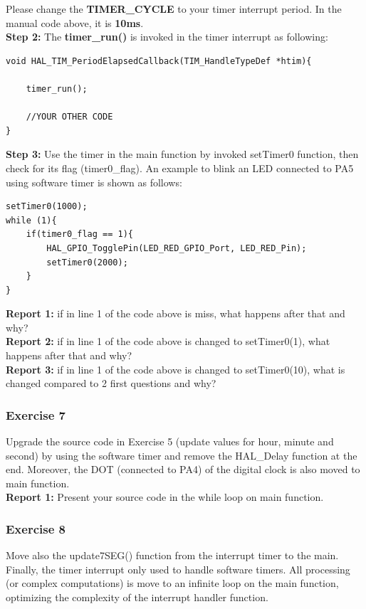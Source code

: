Please change the \textbf{TIMER\_CYCLE} to your timer interrupt period. In the manual code above, it is \textbf{10ms}. \\

\textbf{Step 2: } The \textbf{timer\_run()} is invoked in the timer interrupt as following:

\begin{lstlisting}[caption=Software timer based timer interrupt]
void HAL_TIM_PeriodElapsedCallback(TIM_HandleTypeDef *htim){
	
	timer_run();
	
	//YOUR OTHER CODE
}
\end{lstlisting}

\textbf{Step 3: } Use the timer in the main function by invoked setTimer0 function, then check for its flag (timer0\_flag). An example to blink an LED connected to PA5 using software timer is shown as follows:
\begin{lstlisting}[caption=Software timer is used in main fuction to blink the LED]
setTimer0(1000);
while (1){
    if(timer0_flag == 1){
        HAL_GPIO_TogglePin(LED_RED_GPIO_Port, LED_RED_Pin);
        setTimer0(2000);
    }
}
\end{lstlisting}

\textbf{Report 1: } if in line 1 of the code above is miss, what happens after that and why?\\


\textbf{Report 2: } if in line 1 of the code above is changed to setTimer0(1), what happens after that and why?\\

\textbf{Report 3: } if in line 1 of the code above is changed to setTimer0(10), what is changed compared to 2 first questions and why?\\

\subsubsection{Exercise 7}
Upgrade the source code in Exercise 5 (update values for hour, minute and second) by using the software timer and remove the HAL\_Delay function at the end. Moreover, the DOT (connected to PA4) of the digital clock is also moved to main function. \\

\textbf{Report 1: } Present your source code in the while loop on main function.

\subsubsection{Exercise 8}
Move also the update7SEG() function from the interrupt  timer to the main. Finally, the timer interrupt only used to handle  software timers. All processing (or complex computations) is move to an infinite loop on the main function, optimizing the complexity of the interrupt  handler function.\\

